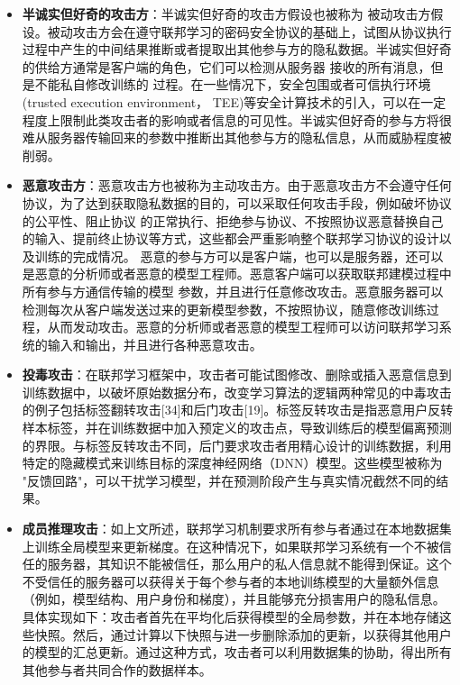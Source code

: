 \begin{itemize}

\item \textbf{半诚实但好奇的攻击方}：半诚实但好奇的攻击方假设也被称为 被动攻击方假设。被动攻击方会在遵守联邦学习的密码安全协议的基础上，试图从协议执行过程中产生的中间结果推断或者提取出其他参与方的隐私数据。半诚实但好奇的供给方通常是客户端的角色，它们可以检测从服务器 接收的所有消息，但是不能私自修改训练的 过程。在一些情况下，安全包围或者可信执行环境(trusted execution environment， TEE)等安全计算技术的引入，可以在一定程度上限制此类攻击者的影响或者信息的可见性。半诚实但好奇的参与方将很难从服务器传输回来的参数中推断出其他参与方的隐私信息，从而威胁程度被削弱。

\item \textbf{恶意攻击方}：恶意攻击方也被称为主动攻击方。由于恶意攻击方不会遵守任何协议，为了达到获取隐私数据的目的，可以采取任何攻击手段，例如破坏协议的公平性、阻止协议 的正常执行、拒绝参与协议、不按照协议恶意替换自己的输入、提前终止协议等方式，这些都会严重影响整个联邦学习协议的设计以及训练的完成情况。
恶意的参与方可以是客户端，也可以是服务器，还可以是恶意的分析师或者恶意的模型工程师。恶意客户端可以获取联邦建模过程中所有参与方通信传输的模型 参数，并且进行任意修改攻击。恶意服务器可以检测每次从客户端发送过来的更新模型参数，不按照协议，随意修改训练过程，从而发动攻击。恶意的分析师或者恶意的模型工程师可以访问联邦学习系统的输入和输出，并且进行各种恶意攻击。

\item \textbf{投毒攻击}：在联邦学习框架中，攻击者可能试图修改、删除或插入恶意信息到训练数据中，以破坏原始数据分布，改变学习算法的逻辑两种常见的中毒攻击的例子包括标签翻转攻击[34]和后门攻击[19]。标签反转攻击是指恶意用户反转样本标签，并在训练数据中加入预定义的攻击点，导致训练后的模型偏离预测的界限。与标签反转攻击不同，后门要求攻击者用精心设计的训练数据，利用特定的隐藏模式来训练目标的深度神经网络（DNN）模型。这些模型被称为 "反馈回路"，可以干扰学习模型，并在预测阶段产生与真实情况截然不同的结果。

\item \textbf{成员推理攻击}：如上文所述，联邦学习机制要求所有参与者通过在本地数据集上训练全局模型来更新梯度。在这种情况下，如果联邦学习系统有一个不被信任的服务器，其知识不能被信任，那么用户的私人信息就不能得到保证。这个不受信任的服务器可以获得关于每个参与者的本地训练模型的大量额外信息（例如，模型结构、用户身份和梯度），并且能够充分损害用户的隐私信息。具体实现如下：攻击者首先在平均化后获得模型的全局参数，并在本地存储这些快照。然后，通过计算以下快照与进一步删除添加的更新，以获得其他用户的模型的汇总更新。通过这种方式，攻击者可以利用数据集的协助，得出所有其他参与者共同合作的数据样本。


\end{itemize}
